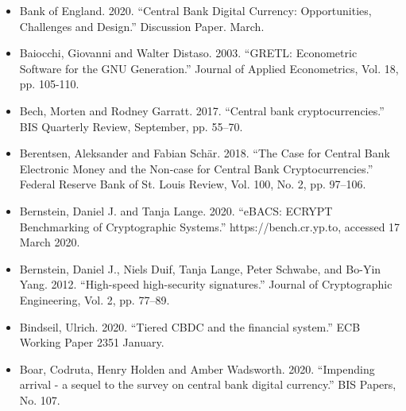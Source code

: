 \documentclass[10pt,spanish]{article}
\begin{document}
\begin{itemize}
\item Bank of England. 2020. ``Central Bank Digital Currency: Opportunities,
Challenges and Design.'' Discussion Paper. March.
\end{itemize}

\begin{itemize}
\item Baiocchi, Giovanni and Walter Distaso. 2003. ``GRETL: Econometric
Software for the GNU Generation.'' Journal of Applied Econometrics, Vol.
18, pp. 105-110.
\end{itemize}

\begin{itemize}
\item Bech, Morten and Rodney Garratt. 2017. ``Central bank
cryptocurrencies.'' BIS Quarterly Review, September, pp. 55--70.
\end{itemize}

\begin{itemize}
\item Berentsen, Aleksander and Fabian Schär. 2018. ``The Case for Central
Bank Electronic Money and the Non-case for Central Bank
Cryptocurrencies.'' Federal Reserve Bank of St. Louis Review, Vol. 100,
No. 2, pp. 97--106.
\end{itemize}

\begin{itemize}
\item Bernstein, Daniel J. and Tanja Lange. 2020. ``eBACS: ECRYPT Benchmarking
of Cryptographic Systems.'' https://bench.cr.yp.to, accessed 17 March
2020.
\end{itemize}

\begin{itemize}
\item Bernstein, Daniel J., Niels Duif, Tanja Lange, Peter Schwabe, and Bo-Yin
Yang. 2012. ``High-speed high-security signatures.'' Journal of
Cryptographic Engineering, Vol. 2, pp. 77--89.
\end{itemize}

\begin{itemize}
\item Bindseil, Ulrich. 2020. ``Tiered CBDC and the financial system.'' ECB
Working Paper 2351 January.
\end{itemize}

\begin{itemize}
\item Boar, Codruta, Henry Holden and Amber Wadsworth. 2020. ``Impending
arrival - a sequel to the survey on central bank digital currency.'' BIS
Papers, No. 107.
\end{itemize}
\end{document}
